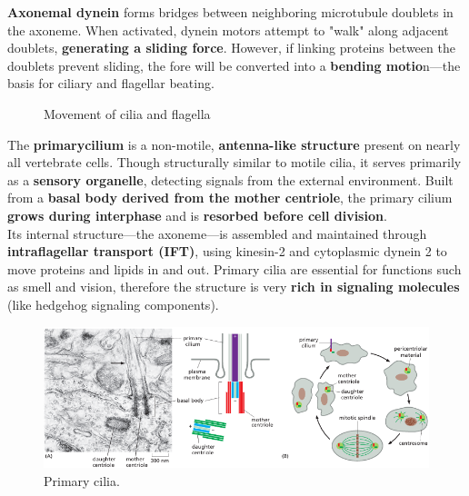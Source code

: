 \documentclass[../main.tex]{subfiles}
\begin{document}
\textbf{Axonemal dynein} forms bridges between neighboring microtubule doublets in the axoneme. When activated, dynein motors attempt to "walk" along adjacent doublets, \textbf{generating a sliding force}. However, if linking proteins between the doublets prevent sliding, the fore will be converted into a \textbf{bending motio}n—the basis for ciliary and flagellar beating.
\begin{figure}[H]
	\centering
	\caption{Movement of cilia and flagella}
\end{figure}

The \textbf{\gls{primarycilium}} is a non-motile, \textbf{antenna-like structure} present on nearly all vertebrate cells. Though structurally similar to motile cilia, it serves primarily as a \textbf{sensory organelle}, detecting signals from the external environment. Built from a \textbf{basal body derived from the mother centriole}, the primary cilium \textbf{grows during interphase} and is \textbf{resorbed before cell division}.\\
\indent Its internal structure—the axoneme—is assembled and maintained through \textbf{intraflagellar transport (IFT)}, using kinesin-2 and cytoplasmic dynein 2 to move proteins and lipids in and out. Primary cilia are essential for functions such as smell and vision, therefore the structure is very \textbf{rich in signaling molecules} (like hedgehog signaling components).

\begin{figure}[H]
	\centering
	\includegraphics[width = 0.9 \textwidth]{38}
	\caption{Primary cilia.}
\end{figure}
\end{document}
